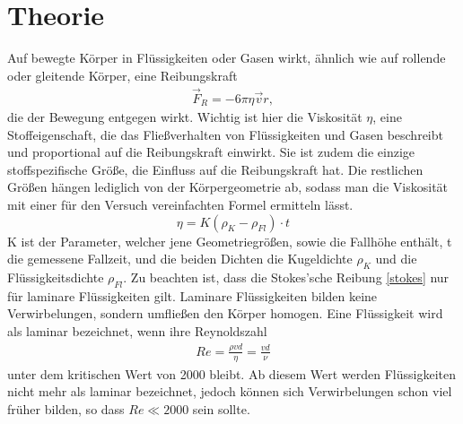 \newpage					%




	\section{Theorie}
Auf bewegte Körper in Flüssigkeiten oder Gasen wirkt, ähnlich wie auf rollende oder gleitende Körper, eine Reibungskraft
\begin{align}
\vec F_R=-6 \pi \eta \vec{v} r,
\label{stokes}
\end{align}
 die der Bewegung entgegen wirkt. Wichtig ist hier die Viskosität $\eta $, eine Stoffeigenschaft, die das Fließverhalten von Flüssigkeiten und Gasen beschreibt und proportional auf die Reibungskraft einwirkt. Sie ist zudem die einzige stoffspezifische Größe, die Einfluss auf die Reibungskraft hat. Die restlichen Größen hängen lediglich von der Körpergeometrie ab, sodass man die Viskosität mit einer für den Versuch vereinfachten Formel ermitteln lässt. 
 \begin{equation}
  \eta = K(\rho_K - \rho_{Fl})\cdot t
  \label{viskos}
 \end{equation}
 K ist der Parameter, welcher jene Geometriegrößen, sowie die Fallhöhe enthält, t die gemessene Fallzeit, und die beiden Dichten die Kugeldichte $\rho_K$ und die Flüssigkeitsdichte $\rho_{Fl}$.
 Zu beachten ist, dass die Stokes'sche Reibung \eqref{stokes} nur für laminare Flüssigkeiten gilt. Laminare Flüssigkeiten bilden keine Verwirbelungen, sondern umfließen den Körper homogen. Eine Flüssigkeit wird als laminar bezeichnet, wenn ihre Reynoldszahl
 \begin{align}
 Re= \frac{\rho v d}{\eta} = \frac{v d}{\nu}
 \label{rey}
 \end{align}
unter dem kritischen Wert von 2000 bleibt. Ab diesem Wert werden Flüssigkeiten nicht mehr als laminar bezeichnet, jedoch können sich Verwirbelungen schon viel früher bilden, so dass  $Re \ll 2000$ sein sollte. 

